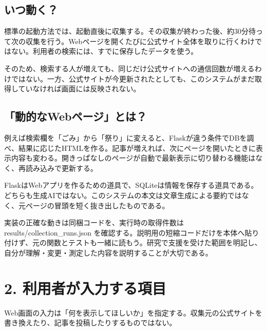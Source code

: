 \documentclass[a4paper,10pt]{ltjsarticle}
\begin{document}
\subsection*{いつ動く？}

標準の起動方法では、起動直後に収集する。その収集が終わった後、約30分待って次の収集を行う。Webページを開くたびに公式サイト全体を取りに行くわけではない。利用者の検索には、すでに保存したデータを使う。


そのため、検索する人が増えても、同じだけ公式サイトへの通信回数が増えるわけではない。一方、公式サイトが今更新されたとしても、このシステムがまだ取得していなければ画面には反映されない。


\subsection*{「動的なWebページ」とは？}

例えば検索欄を「ごみ」から「祭り」に変えると、Flaskが違う条件でDBを調べ、結果に応じたHTMLを作る。記事が増えれば、次にページを開いたときに表示内容も変わる。開きっぱなしのページが自動で最新表示に切り替わる機能はなく、再読み込みで更新する。


FlaskはWebアプリを作るための道具で、SQLiteは情報を保存する道具である。どちらも生成AIではない。このシステムの本文は文章生成による要約ではなく、元ページの冒頭を短く抜き出したものである。


実装の正確な動きは同梱コードを、実行時の取得件数は results/collection\_runs.json を確認する。説明用の短縮コードだけを本体へ貼り付けず、元の関数とテストも一緒に読もう。研究で支援を受けた範囲を明記し、自分が理解・変更・測定した内容を説明することが大切である。


\clearpage

\section*{2. 利用者が入力する項目}

Web画面の入力は「何を表示してほしいか」を指定する。収集元の公式サイトを書き換えたり、記事を投稿したりするものではない。
\end{document}
